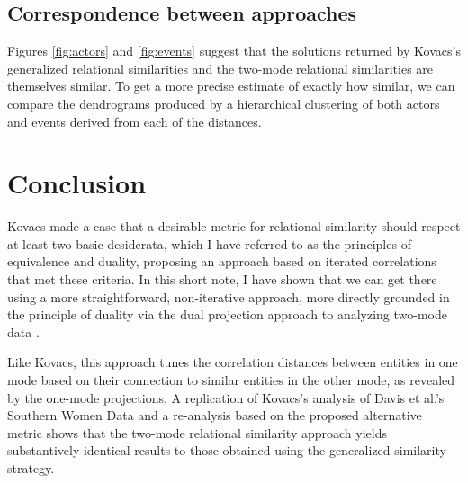 \documentclass[a4paper,fleqn]{cas-sc}
\begin{document}
\subsection{Correspondence between approaches}
Figures \ref{fig:actors} and \ref{fig:events} suggest that the solutions returned by Kovacs's generalized relational similarities and the two-mode relational similarities are themselves similar. To get a more precise estimate of exactly how similar, we can compare the dendrograms produced by a hierarchical clustering of both actors and events derived from each of the distances. 

\section{Conclusion}
Kovacs \citeyearpar{kovacs2010} made a case that a desirable metric for relational similarity should respect at least two basic desiderata, which I have referred to as the principles of equivalence and duality, proposing an approach based on iterated correlations that met these criteria. In this short note, I have shown that we can get there using a more straightforward, non-iterative approach, more directly grounded in the principle of duality via the dual projection approach to analyzing two-mode data \citep{everett2013}. 

Like Kovacs, this approach tunes the correlation distances between entities in one mode based on their connection to similar entities in the other mode, as revealed by the one-mode projections. A replication of Kovacs's analysis of Davis et al.'s \citeyearpar{davis1941} Southern Women Data and a re-analysis based on the proposed alternative metric shows that the two-mode relational similarity approach yields substantively identical results to those obtained using the generalized similarity strategy. 

%


\end{document}
